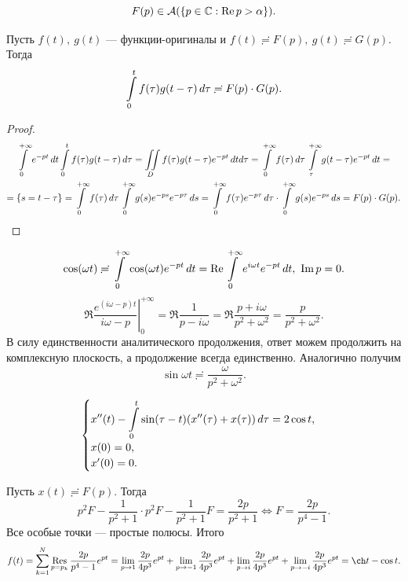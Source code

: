 	\vspace{-\baselineskip}
	\begin{remark*}
		\[ F(p)\in\mathcal{A}(\{p\in\mathbb{C}: \operatorname{Re} p > \alpha\}).\]
	\end{remark*}
	\begin{statement}
		Пусть $f(t),\ g(t)$ --- функции-оригиналы и $f(t)\risingdotseq F(p),\ g(t)\risingdotseq G(p)$. Тогда
		\[ \int\limits_0^tf(\tau)g(t-\tau)\,d\tau\risingdotseq F(p)\cdot G(p). \] 
	\end{statement}
	\begin{proof}
		\begin{multline*}
			\int\limits_0^{+\infty}e^{-pt}\,dt\int\limits_0^t f(\tau)g(t-\tau)\,d\tau = \iint\limits_D f(\tau)g(t-\tau)e^{-pt}\,dtd\tau = \int\limits_0^{+\infty}f(\tau)\,d\tau\int\limits_\tau^{+\infty}g(t-\tau)e^{-pt}\,dt =\\= \{s =t-\tau\}= \int\limits_0^{+\infty}f(\tau)\,d\tau\int\limits_0^{+\infty}g(s)e^{-ps}e^{-p\tau}\,ds = \int\limits_0^{+\infty}f(\tau)e^{-p\tau}\,d\tau\cdot\int\limits_0^{+\infty}g(s)e^{-ps}\,ds = F(p)\cdot G(p).
		\end{multline*}
	\end{proof}
	\vspace{-\baselineskip}
	\begin{example*}
		\[ \cos(\omega t)\risingdotseq\int\limits_0^{+\infty}\cos(\omega t)e^{-pt}\,dt = \operatorname{Re}\int\limits_0^{+\infty}e^{i\omega t}e^{-pt}\,dt,\ \operatorname{Im} p = 0. \]
		\[ \Re\left.\frac{e^{(i\omega -p)t}}{i\omega - p}\right|_0^{+\infty} = \Re\frac{1}{p-i\omega} = \Re\frac{p+i\omega}{p^2+\omega^2} = \frac{p}{p^2+\omega^2}. \]
		В силу единственности аналитического продолжения, ответ можем продолжить на комплексную плоскость, а продолжение всегда единственно. Аналогично получим		
		\[\sin\omega t\risingdotseq\frac{\omega}{p^2+\omega^2}. \]
	\end{example*}
	\begin{example*}
		\[ \begin{cases}\displaystyle x''(t) - \int\limits_0^t\sin(\tau - t)(x''(\tau) + x(\tau))\,d\tau = 2\cos t,\\x(0) = 0,\\x'(0) = 0. \end{cases} \]
	\end{example*}
	Пусть $x(t)\risingdotseq F(p)$. Тогда
	\[ p^2F - \frac{1}{p^2+1}\cdot p^2F - \frac{1}{p^2+1}F = \frac{2p}{p^2+1}\iff F = \frac{2p}{p^4-1}. \]
	Все особые точки --- простые полюсы. Итого
	\[ f(t) = \Sum_{k=1}^N\Res_{p=p_k}\frac{2p}{p^4-1}e^{pt} = \Lim_{p\to1}\frac{2p}{4p^3}e^{pt}+\Lim_{p\to-1}\frac{2p}{4p^3}e^{pt} + \Lim_{p\to i}\frac{2p}{4p^3}e^{pt}+\Lim_{p\to-i}\frac{2p}{4p^3}e^{pt} = \ch t - \cos t.\]
